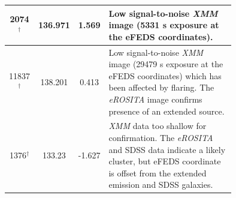 \documentclass[fleqn,usenatbib]{mnras}
\begin{document}
\begin{table}
\begin{center}
\begin{tabular}{ccc|p{0.75\linewidth}}
\hline
2074$^\dagger$ & 136.971 & 1.569 & Low signal-to-noise {\em XMM} image (5331 s exposure at the eFEDS coordinates). \\ 
\hline
11837$^\dagger$ & 138.201 & 0.413 & Low signal-to-noise {\em XMM} image (29479 s exposure at the eFEDS coordinates) which has been affected by flaring. The {\em eROSITA} image confirms presence of an extended source. \\ 
\hline
1376$^\dagger$ & 133.23 & -1.627 & {\em XMM} data too shallow for confirmation. The {\em eROSITA} and SDSS data indicate a likely cluster, but eFEDS coordinate is offset from the extended emission and SDSS galaxies.  \\ 
\hline
\end{tabular}
\end{center}
\end{table}
\end{document}
